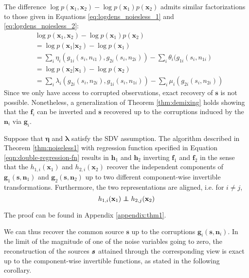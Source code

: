 The difference $\log p(\bm{x}_1, \bm{x}_2) - \log p(\bm{x}_1)p(\bm{x}_2)$ admits similar factorizations to those given in Equations \ref{eq:logdens_noiesless_1} and \ref{eq:logdens_noiesless_2}:
\begin{align}
&\log p(\bm{x}_1, \bm{x}_2) - \log p(\bm{x}_1) p(\bm{x}_2) \nonumber\\
&= \log p(\bm{x}_1 | \bm{x}_2) - \log p(\bm{x}_1)\nonumber\\
&= \sum_i \eta_i(g_{1i}(s_i, n_{i1}), g_{2i}(s_i, n_{2i})) - \sum_i \theta_i(g_{1i}(s_i, n_{1i}) \label{eq:noisylogdens_1}\\
&= \log p(\bm{x}_2 | \bm{x}_1) - \log p(\bm{x}_2) \nonumber\\
&= \sum_i \lambda_i(g_{2i}(s_i, n_{2i}), g_{1i}(s_i, n_{1i})) - \sum_i \mu_i(g_{2i}(s_i, n_{2i})) \label{eq:noisylogdens_2}
\end{align}
Since we only have access to corrupted observations, exact recovery of $\bm{s}$ is not possible.
Nonetheless, a generalization of Theorem \ref{thm:demixing} holds showing that the $\bm{f}_i$ can be inverted and $\bm{s}$ recovered up to the corruptions induced by the $\bm{n}_i$ via $\bm{g}_i$.
\begin{theorem}\label{thm:two-noisy-views}
Suppose that $\bm{\eta}$ and $\bm{\lambda}$ satisfy the SDV assumption.
The algorithm described in Theorem \ref{thm:noiseless1} with regression function specified in Equation \ref{eqn:double-regression-fn} results in $\bm{h}_1$ and $\bm{h}_2$ inverting $\bm{f}_1$ and $\bm{f}_2$ in the sense that the $h_{1,i}(\bm{x}_1)$ and $h_{2,i}(\bm{x}_2)$ recover the independent components of $\bm{g}_1(\bm{s}, \bm{n}_1)$ and $\bm{g}_2(\bm{s}, \bm{n}_2)$ up to two different component-wise invertible transformations. Furthermore, the two representations are aligned, i.e. for $i\not=j$,
\begin{equation*}
    h_{1,i}(\mathbf{x}_{1})\independent h_{2,j}(\mathbf{x}_{2})
\end{equation*}
\end{theorem}
The proof can be found in Appendix \ref{appendix:thm1}.




We can thus recover the common source $\bm{s}$ up to the corruptions $\bm{g}_i(\bm{s}, \bm{n}_i)$.
In the limit of the magnitude of one of the noise variables going to zero, the reconstruction of the sources ${\bm{s}}$ attained through the corresponding view is exact up to the component-wise invertible functions, as stated in the following corollary.



